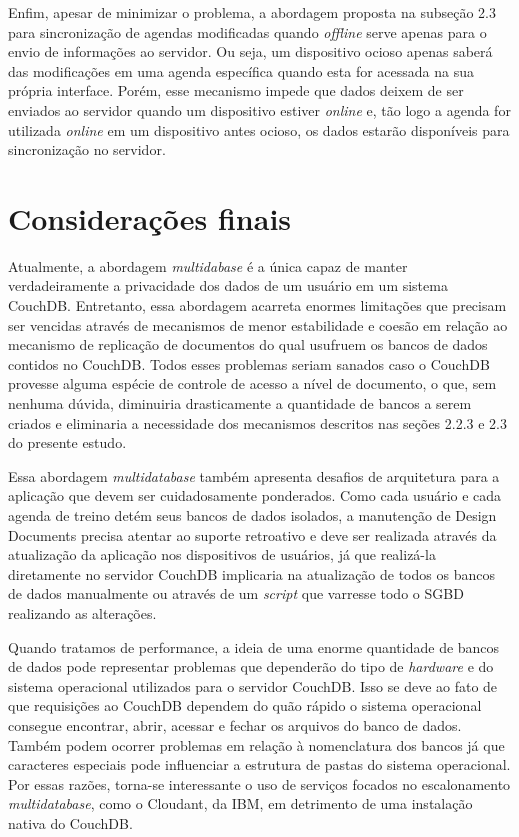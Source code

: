 \documentclass[
	article,			%
	11pt,				%
	oneside,			%
	a4paper,			%
	english,			%
	brazil,				%
	sumario=tradicional
	]{abntex2}
\begin{document}
Enfim, apesar de minimizar o problema, a abordagem proposta na subseção 2.3 para sincronização de agendas modificadas quando \textit{offline} serve apenas para o envio de informações ao servidor. Ou seja, um dispositivo ocioso apenas saberá das modificações em uma agenda específica quando esta for acessada na sua própria interface. Porém, esse mecanismo impede que dados deixem de ser enviados ao servidor quando um dispositivo estiver \textit{online} e, tão logo a agenda for utilizada \textit{online} em um dispositivo antes ocioso, os dados estarão disponíveis para sincronização no servidor.

\section*{Considerações finais}

Atualmente, a abordagem \textit{multidabase} é a única capaz de manter verdadeiramente a privacidade dos dados de um usuário em um sistema CouchDB. Entretanto, essa abordagem acarreta enormes limitações que precisam ser vencidas através de mecanismos de menor estabilidade e coesão em relação ao mecanismo de replicação de documentos do qual usufruem os bancos de dados contidos no CouchDB. Todos esses problemas seriam sanados caso o CouchDB provesse alguma espécie de controle de acesso a nível de documento, o que, sem nenhuma dúvida, diminuiria drasticamente a quantidade de bancos a serem criados e eliminaria a necessidade dos mecanismos descritos nas seções 2.2.3 e 2.3 do presente estudo.

Essa abordagem \textit{multidatabase} também apresenta desafios de arquitetura para a aplicação que devem ser cuidadosamente ponderados. Como cada usuário e cada agenda de treino detém seus bancos de dados isolados, a manutenção de Design Documents precisa atentar ao suporte retroativo e deve ser realizada através da atualização da aplicação nos dispositivos de usuários, já que realizá-la diretamente no servidor CouchDB implicaria na atualização de todos os bancos de dados manualmente ou através de um \textit{script} que varresse todo o SGBD realizando as alterações.

Quando tratamos de performance, a ideia de uma enorme quantidade de bancos de dados pode representar problemas que dependerão do tipo de \textit{hardware} e do sistema operacional utilizados para o servidor CouchDB. Isso se deve ao fato de que requisições ao CouchDB dependem do quão rápido o sistema operacional consegue encontrar, abrir, acessar e fechar os arquivos do banco de dados. Também podem ocorrer problemas em relação à nomenclatura dos bancos já que caracteres especiais pode influenciar a estrutura de pastas do sistema operacional. Por essas razões, torna-se interessante o uso de serviços focados no escalonamento \textit{multidatabase}, como o Cloudant, da IBM, em detrimento de uma instalação nativa do CouchDB.
\end{document}
